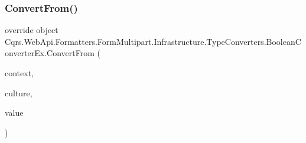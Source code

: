 \subsubsection{\texorpdfstring{Convert\+From()}{ConvertFrom()}}
{\footnotesize\ttfamily override object Cqrs.\+Web\+Api.\+Formatters.\+Form\+Multipart.\+Infrastructure.\+Type\+Converters.\+Boolean\+Converter\+Ex.\+Convert\+From (\begin{DoxyParamCaption}\item[{I\+Type\+Descriptor\+Context}]{context,  }\item[{Culture\+Info}]{culture,  }\item[{object}]{value }\end{DoxyParamCaption})}

